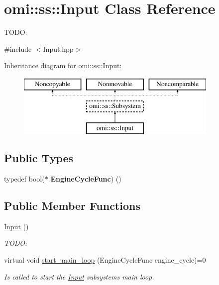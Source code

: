 \hypertarget{classomi_1_1ss_1_1_input}{}\section{omi\+:\+:ss\+:\+:Input Class Reference}
\label{classomi_1_1ss_1_1_input}


T\+O\+DO\+:  




{\ttfamily \#include $<$Input.\+hpp$>$}

Inheritance diagram for omi\+:\+:ss\+:\+:Input\+:\begin{figure}[H]
\begin{center}
\leavevmode
\includegraphics[height=3.000000cm]{classomi_1_1ss_1_1_input}
\end{center}
\end{figure}
\subsection*{Public Types}
\begin{DoxyCompactItemize}
\item 
typedef bool($\ast$ {\bfseries Engine\+Cycle\+Func}) ()\hypertarget{classomi_1_1ss_1_1_input_a335476b6a5ee96900ce2de73f0624077}{}\label{classomi_1_1ss_1_1_input_a335476b6a5ee96900ce2de73f0624077}

\end{DoxyCompactItemize}
\subsection*{Public Member Functions}
\begin{DoxyCompactItemize}
\item 
\hyperlink{classomi_1_1ss_1_1_input_ace2801947529de88eef5ca404f471103}{Input} ()\hypertarget{classomi_1_1ss_1_1_input_ace2801947529de88eef5ca404f471103}{}\label{classomi_1_1ss_1_1_input_ace2801947529de88eef5ca404f471103}

\begin{DoxyCompactList}\small\item\em T\+O\+DO\+: \end{DoxyCompactList}\item 
virtual void \hyperlink{classomi_1_1ss_1_1_input_a6a75340edb3f75ee4318f66905ddab0a}{start\+\_\+main\+\_\+loop} (Engine\+Cycle\+Func engine\+\_\+cycle)=0
\begin{DoxyCompactList}\small\item\em Is called to start the \hyperlink{classomi_1_1ss_1_1_input}{Input} subsystem\textquotesingle{}s main loop. \end{DoxyCompactList}\end{DoxyCompactItemize}
